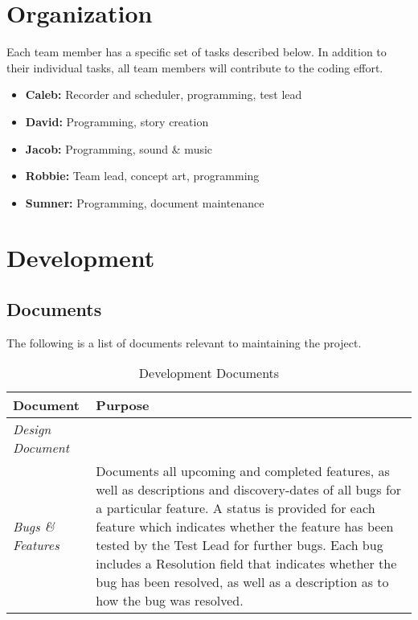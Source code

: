 \documentclass[12pt,titlepage]{article}
\begin{document}
\section{Organization}
\label{sec:org}
Each team member has a specific set of tasks described below. In addition to
their individual tasks, all team members will contribute to the coding effort.
\begin{itemize}
    \item \textbf{Caleb:} Recorder and scheduler, programming, test lead
    \item \textbf{David:} Programming, story creation
    \item \textbf{Jacob:} Programming, sound \& music
    \item \textbf{Robbie:} Team lead, concept art, programming
    \item \textbf{Sumner:} Programming, document maintenance
\end{itemize}

\section{Development}
\label{sec:dev}

\subsection{Documents}

The following is a list of documents relevant to maintaining the project.

\begin{table}[H]
\centering
\caption{Development Documents}
\begin{tabularx}{\linewidth}{|l|X|}
\hline
{\bf Document}         & {\bf Purpose} \\ \hline
{\it Design Document}  & \\ \hline
{\it Bugs \& Features} & Documents all upcoming and completed features, as well
                         as descriptions and discovery-dates of all bugs for a
                         particular feature. A status is provided for each
                         feature which indicates whether the feature has been
                         tested by the Test Lead for further bugs. Each bug
                         includes a Resolution field that indicates whether the
                         bug has been resolved, as well as a description as to
                         how the bug was resolved. \\ \hline
\end{tabularx}
\end{table}
\end{document}
